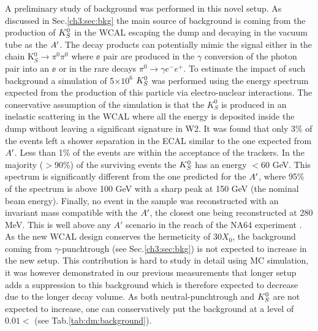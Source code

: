 A preliminary study of background was performed in this novel setup. As discussed in Sec.\ref{ch3:sec:bkg} the main source of background is coming from the production of $K^0_S$ in the WCAL escaping the dump and decaying in the vacuum tube as the $A'$. The decay products can potentially mimic the signal either in the chain K$^0_S \rightarrow \pi^0 \pi^0$ where $\ee$ pair are produced in the $\gamma$ conversion of the photon pair into an $\ee$ or in the rare decays $\pi^0 \rightarrow \gamma e^- e^+$. To estimate the impact of such background a simulation of 5$\times 10^6$ $K^0_S$ was performed using the energy spectrum expected from the production of this particle via electro-nuclear interactions.
The conservative assumption of the simulation is that the $K^0_S$ is produced in an inelastic scattering in the WCAL where all the energy is deposited inside the dump without leaving a significant signature in W2. It was found that only 3\% of the events left a shower separation in the ECAL similar to the one expected from $A'$. Less than 1\% of the events are within the acceptance of the trackers. In the majority ($>$90\%) of the surviving events the $K^0_S$ has an energy $<$60 GeV. This spectrum is significantly different from the one predicted for the $A'$, where 95\% of the spectrum is above 100 GeV with a sharp peak at 150 GeV (the nominal beam energy). Finally, no event in the sample was reconstructed with an invariant mass compatible with the $A'$, the closest one being reconstructed at 280 MeV. This is well above any $A'$ scenario in the reach of the NA64 experiment \cite{Banerjee:2019hmi}. As the new WCAL design conserves the hermeticity of 30$X_0$, the background coming from $\gamma$-punchtrough (see Sec.\ref{ch3:sec:bkg}) is not expected to increase in the new setup. This contribution is hard to study in detail using MC simulation, it was however demonstrated in our previous measurements \cite{Banerjee:2019hmi} that longer setup adds a suppression to this background which is therefore expected to decrease due to the longer decay volume. As both neutral-punchtrough and $K^0_S$ are not expected to increase, one can conservatively put the background at a level of $0.01<$ (see Tab.\ref{tab:dm:background}).


